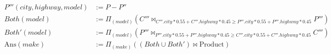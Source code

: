 \documentclass[12pt,letterpaper]{article}
\newcommand{\parens}[1]{\left(#1\right)}
\newcommand{\Ans}[0]{\text{Ans}}
\newcommand{\Product}[0]{\text{Product}}
\begin{document}
\begin{enumerate}
\begin{enumerate}
\begin{align*}
            P'''(city, highway, model) &:= P - P'' \\
            Both(model) &:= \Pi_{\parens{model}}\parens{C''' \bowtie_{C'''.city * 0.55 + C'''.highway * 0.45 \ge P'''.city * 0.55 + P'''.highway * 0.45} P'''} \\
            Both'(model) &:= \Pi_{\parens{model}}\parens{P''' \bowtie_{P'''.city * 0.55 + P'''.highway * 0.45 \ge C'''.city * 0.55 + C'''.highway * 0.45} C'''} \\
            \Ans(make) &:= \Pi_{\parens{make}}\parens{\parens{Both \cup Both'} \bowtie \Product}
          \end{align*}
      \end{enumerate}
  \end{enumerate}
\end{document}
